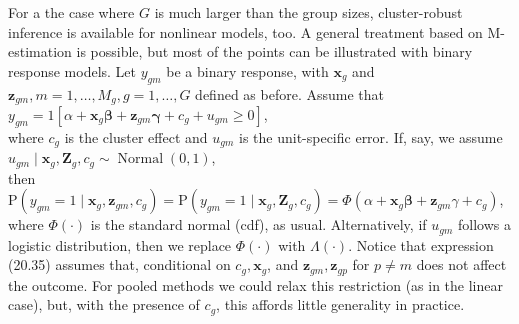 \documentclass[10pt]{article}
\begin{document}
For a the case where $G$ is much larger than the group sizes, cluster-robust inference is available for nonlinear models, too. A general treatment based on M-estimation is possible, but most of the points can be illustrated with binary response models. Let $y_{g m}$ be a binary response, with $\mathbf{x}_{g}$ and $\mathbf{z}_{g m}, m=1, \ldots, M_{g}, g=1, \ldots, G$ defined as before. Assume that\\
$y_{g m}=1\left[\alpha+\mathbf{x}_{g} \boldsymbol{\beta}+\mathbf{z}_{g m} \boldsymbol{\gamma}+c_{g}+u_{g m} \geq 0\right]$,\\
where $c_{g}$ is the cluster effect and $u_{g m}$ is the unit-specific error. If, say, we assume\\
$u_{g m} \mid \mathbf{x}_{g}, \mathbf{Z}_{g}, c_{g} \sim \operatorname{Normal}(0,1)$,\\
then\\
$\mathrm{P}\left(y_{g m}=1 \mid \mathbf{x}_{g}, \mathbf{z}_{g m}, c_{g}\right)=\mathrm{P}\left(y_{g m}=1 \mid \mathbf{x}_{g}, \mathbf{Z}_{g}, c_{g}\right)=\Phi\left(\alpha+\mathbf{x}_{g} \boldsymbol{\beta}+\mathbf{z}_{g m} \gamma+c_{g}\right)$,\\
where $\Phi(\cdot)$ is the standard normal (cdf), as usual. Alternatively, if $u_{g m}$ follows a logistic distribution, then we replace $\Phi(\cdot)$ with $\Lambda(\cdot)$. Notice that expression (20.35) assumes that, conditional on $c_{g}, \mathbf{x}_{g}$, and $\mathbf{z}_{g m}, \mathbf{z}_{g p}$ for $p \neq m$ does not affect the outcome. For pooled methods we could relax this restriction (as in the linear case), but, with the presence of $c_{g}$, this affords little generality in practice.
\end{document}
